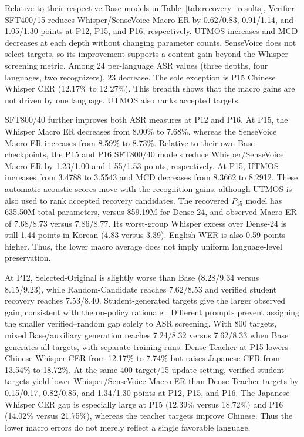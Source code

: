 \documentclass{article}
\begin{document}
Relative to their respective Base models in
Table~\ref{tab:recovery_results}, Verifier-SFT400/15 reduces
Whisper/SenseVoice Macro ER by 0.62/0.83, 0.91/1.14, and 1.05/1.30
points at P12, P15, and P16, respectively. UTMOS increases and MCD
decreases at each depth without changing parameter counts. SenseVoice
does not select targets, so its improvement supports a content gain
beyond the Whisper screening metric. Among 24 per-language ASR values
(three depths, four languages, two recognizers), 23 decrease. The sole
exception is P15 Chinese Whisper CER (12.17\% to 12.27\%). This breadth
shows that the macro gains are not driven by one language. UTMOS also
ranks accepted targets.

SFT800/40 further improves both ASR measures at P12 and P16. At P15, the Whisper Macro ER decreases from 8.00\% to 7.68\%, whereas the SenseVoice Macro ER
increases from 8.59\% to 8.73\%. Relative to their own Base checkpoints, the P15 and P16
SFT800/40 models reduce Whisper/SenseVoice Macro ER by
1.23/1.00 and 1.55/1.53 points, respectively.
At P15, UTMOS increases from 3.4788 to 3.5543 and
MCD decreases from 8.3662 to 8.2912. These automatic acoustic scores
move with the recognition gains, although UTMOS is also used to rank
accepted recovery candidates. The recovered \(P_{15}\) model has
635.50M total parameters, versus 859.19M for Dense-24, and observed
Macro ER of 7.68/8.73 versus 7.86/8.77. Its worst-group Whisper
excess over Dense-24 is still 1.44 points in Korean (4.83 versus
3.39). English WER is also 0.59 points higher. Thus, the lower macro
average does not imply uniform language-level preservation.

At P12, Selected-Original is slightly worse than Base (8.28/9.34
versus 8.15/9.23), while Random-Candidate reaches 7.62/8.53 and
verified student recovery reaches 7.53/8.40. Student-generated targets
give the larger observed gain, consistent with the on-policy rationale
\cite{agarwal2024onpolicy}. Different prompts prevent assigning the
smaller verified--random gap solely to ASR screening. With 800 targets,
mixed Base/auxiliary generation reaches 7.24/8.32 versus 7.62/8.33
when Base generates all targets, with separate training runs.
Dense-Teacher at P15 lowers Chinese Whisper CER from 12.17\% to 7.74\%
but raises Japanese CER from 13.54\% to 18.72\%. At the same 400-target/15-update setting, verified student targets
yield lower Whisper/SenseVoice Macro ER than Dense-Teacher targets by
0.15/0.17, 0.82/0.85, and 1.34/1.30 points at P12, P15, and P16. The Japanese
Whisper CER gap is especially large at P15 (12.39\% versus 18.72\%)
and P16 (14.02\% versus 21.75\%), whereas the teacher targets improve
Chinese. Thus the lower macro errors do not merely reflect a single
favorable language.
\end{document}
